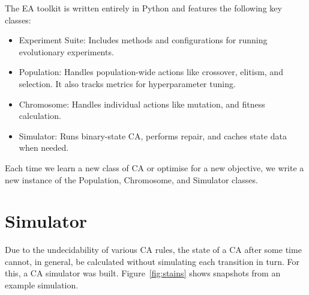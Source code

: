 The EA toolkit is written entirely in Python and features the following key classes:
\begin{itemize}
    \item Experiment Suite: Includes methods and configurations for running evolutionary experiments.
    \item Population: Handles population-wide actions like crossover, elitism, and selection. It also tracks metrics for hyperparameter tuning.
    \item Chromosome: Handles individual actions like mutation, and fitness calculation.
    \item Simulator: Runs binary-state CA, performs repair, and caches state data when needed.
\end{itemize}
Each time we learn a new class of CA or optimise for a new objective, we write a new instance of the Population,  Chromosome, and Simulator classes.

\section{Simulator} \label{subsec:simulator-1}
Due to the undecidability of various CA rules, the state of a CA after some time cannot, in general, be calculated without simulating each transition in turn. For this, a CA simulator was built. Figure~\ref{fig:stains} shows snapshots from an example simulation.

